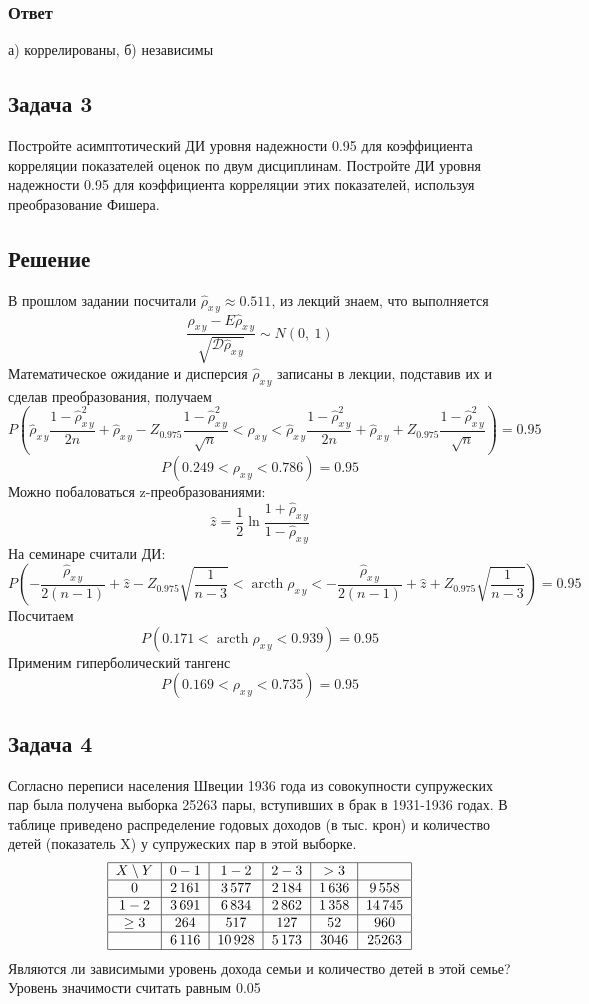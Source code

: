 \documentclass[12pt, a4paper]{article}
\newcommand{\dev}{\mathcal{D}}
\begin{document}
\subsubsection*{Ответ}
а) коррелированы, б) независимы
\subsection*{Задача 3}
Постройте асимптотический ДИ уровня надежности 0.95 для коэффициента корреляции показателей оценок по двум дисциплинам. Постройте ДИ уровня надежности 0.95 для коэффициента корреляции этих показателей, используя преобразование Фишера.
\subsection*{Решение}
В прошлом задании посчитали $\hat \rho_{x\, y} \approx 0.511$, из лекций знаем, что выполняется
\[
\frac{ \hat \rho_{x\, y} - E\hat\rho_{x\, y} }{ \sqrt{\dev \hat \rho_{x\, y}} } \sim N(0,\ 1)
\]
Математическое ожидание и дисперсия $\hat \rho_{x\, y}$ записаны в лекции, подставив их и сделав преобразования, получаем
\[
P\left( \hat \rho_{x\, y} \frac{1 - \hat\rho^2_{x\, y}}{2n} + \hat \rho_{x\, y} - Z_{0.975} \frac{1 - \hat\rho_{x\, y}^2}{\sqrt{n}} < \rho_{x\, y} < \hat\rho_{x\, y} \frac{1 - \hat\rho^2_{x\, y}}{2n} + \hat \rho_{x\, y} + Z_{0.975} \frac{1 - \hat\rho_{x\, y}^2}{\sqrt{n}} \right) = 0.95
\]
\[
P\left( 0.249 < \rho_{x\, y} < 0.786 \right) = 0.95
\]
Можно побаловаться z-преобразованиями:
\[
\hat z = \frac{1}{2} \ln \frac{1 + \hat \rho_{x\, y}}{1 - \hat \rho_{x\, y}}
\]
На семинаре считали ДИ:
\[
P \left( -\frac{\hat \rho_{x\, y}}{2(n - 1)} + \hat z - Z_{0.975} \sqrt{\frac{1}{n - 3}} < \operatorname{arcth} \rho_{x\, y} < -\frac{\hat \rho_{x\, y}}{2(n - 1)} + \hat z + Z_{0.975} \sqrt{\frac{1}{n - 3}} \right) = 0.95
\]
Посчитаем
\[
P \left( 0.171 < \operatorname{arcth} \rho_{x\,y } < 0.939 \right) = 0.95
\]
Применим гиперболический тангенс
\[
P\left( 0.169 < \rho_{x\, y} < 0.735 \right) = 0.95
\]
\subsection*{Задача 4}
Согласно переписи населения Швеции 1936 года из совокупности супружеских пар была получена выборка 25263 пары, вступивших в брак в 1931-1936 годах. В таблице приведено распределение годовых доходов (в тыс. крон) и количество детей (показатель X) у супружеских пар в этой выборке.
\[\begin{tabular}{|c|c|c|c|c|c|}
    \hline
    $X\setminus Y$ & $0-1$ & $1-2$ & $2-3$ & $>3$ & \\
    \hline
    $0$            & 2\,161  & 3\,577  & 2\,184  & 1\,636 & 9\,558 \\
    \hline      
    $ 1-2$         & 3\,691  & 6\,834  & 2\,862  & 1\,358 & 14\,745\\
    \hline      
    $ \geq 3$      & 264   & 517   & 127   & 52   & 960\\
    \hline      
                   & 6\,116 & 10\,928 & 5\,173 & 3046 & 25263 \\
    \hline
\end{tabular}\]
Являются ли зависимыми уровень дохода семьи и количество детей в этой семье? Уровень значимости считать равным 0.05
\end{document}
